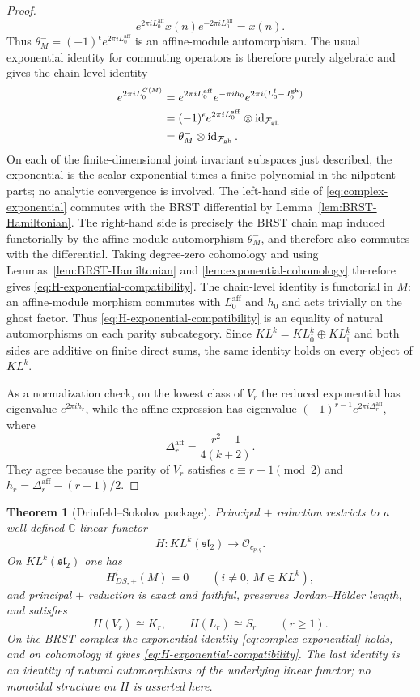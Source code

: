 \documentclass[12pt,leqno]{amsart}
\numberwithin{equation}{section}
\newtheorem{thm}{Theorem}[section]
\newcommand{\id}{\operatorname{id}}
\newcommand{\KL}{KL}
\newcommand{\Oc}{\mathcal O}
\def\C{\mathbb{C}}
\begin{document}
\begin{proof}
\[
 e^{2\pi iL^{\mathrm{aff}}_0}x(n)e^{-2\pi iL^{\mathrm{aff}}_0}=x(n).
\]
Thus $\theta^-_M=(-1)^\epsilon e^{2\pi iL^{\mathrm{aff}}_0}$ is an
affine-module automorphism.  The usual exponential identity for
commuting operators is therefore purely algebraic and gives the
chain-level identity
\begin{align}
 e^{2\pi iL^{C(M)}_0}
 &=e^{2\pi iL^{\mathrm{aff}}_0}
   e^{-\pi ih_0}
   e^{2\pi i(L^{\mathrm f}_0-J^{\mathrm{gh}}_0)}\notag\\
 &=(-1)^\epsilon e^{2\pi iL^{\mathrm{aff}}_0}
   \otimes\id_{\mathcal F_{\mathrm{gh}}}\notag\\
 &=\theta^-_M\otimes\id_{\mathcal F_{\mathrm{gh}}}.
 \label{eq:complex-exponential}
\end{align}
On each of the finite-dimensional joint invariant subspaces just
described, the exponential is the scalar exponential times a finite
polynomial in the nilpotent parts; no analytic convergence is involved.
The left-hand side of \eqref{eq:complex-exponential} commutes with the
BRST differential by Lemma~\ref{lem:BRST-Hamiltonian}.  The right-hand
side is precisely the BRST chain map induced functorially by the
affine-module automorphism $\theta^-_M$, and therefore also commutes
with the differential.  Taking degree-zero cohomology and using
Lemmas~\ref{lem:BRST-Hamiltonian} and
\ref{lem:exponential-cohomology} therefore gives
\eqref{eq:H-exponential-compatibility}.  The chain-level identity is
functorial in $M$: an affine-module morphism commutes with
$L^{\mathrm{aff}}_0$ and $h_0$ and acts trivially on the ghost factor.
Thus \eqref{eq:H-exponential-compatibility} is an equality of natural
automorphisms on each parity subcategory.  Since
$\KL^k=\KL^k_{\bar0}\oplus\KL^k_{\bar1}$ and both sides are additive on
finite direct sums, the same identity holds on every object of $\KL^k$.

As a normalization check, on the lowest class of $V_r$ the reduced
exponential has eigenvalue $e^{2\pi ih_r}$, while the affine expression
has eigenvalue $(-1)^{r-1}e^{2\pi i\Delta^{\mathrm{aff}}_r}$, where
\[
 \Delta^{\mathrm{aff}}_r=\frac{r^2-1}{4(k+2)}.
\]
They agree because the parity of $V_r$ satisfies
$\epsilon\equiv r-1\pmod2$ and
$h_r=\Delta^{\mathrm{aff}}_r-(r-1)/2$.
\end{proof}

\begin{thm}[Drinfeld--Sokolov package]\label{thm:DS-package}
Principal $+$ reduction restricts to a well-defined $\C$-linear functor
\[
 H:\KL^k(\mathfrak{sl}_2)\longrightarrow\Oc_{c_{p,q}}.
\]
On $\KL^k(\mathfrak{sl}_2)$ one has
\[
 H^i_{DS,+}(M)=0\qquad(i\ne0,\,M\in\KL^k),
\]
and principal $+$ reduction is exact and faithful, preserves
Jordan--H\"older length, and satisfies
\[
 H(V_r)\cong K_r,\qquad H(L_r)\cong S_r\qquad(r\ge1).
\]
On the BRST complex the exponential identity
\eqref{eq:complex-exponential} holds, and on cohomology it gives
\eqref{eq:H-exponential-compatibility}.  The last identity is an identity
of natural automorphisms of the underlying linear functor; no monoidal
structure on $H$ is asserted here.
\end{thm}
\end{document}
